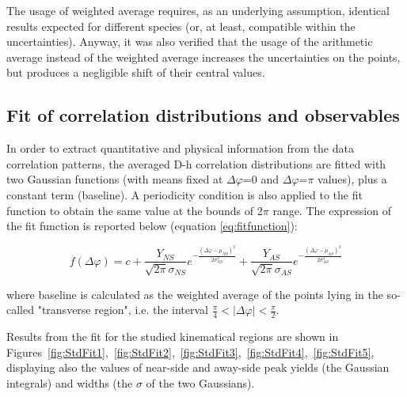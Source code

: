 The usage of weighted average requires, as an underlying assumption, identical results expected for different species (or, at least, compatible within the uncertainties). Anyway, it was also verified that the usage of the arithmetic average instead of the weighted average increases the uncertainties on the points, but produces a negligible shift of their central values.

\clearpage

\subsection{Fit of correlation distributions and observables}
In order to extract quantitative and physical information from the data correlation patterns, the averaged D-h correlation distributions are fitted with two Gaussian functions (with means fixed at $\Delta\varphi$=0 and $\Delta\varphi$=$\pi$ values), plus a constant term (baseline). A periodicity condition is also applied to the fit function to obtain the same value at the bounds of 2$\pi$ range. The expression of the fit function is reported below (equation \ref{eq:fitfunction}):

\begin{equation}
f\left(\Delta\varphi\right) = c + \frac{Y_{NS}}{\sqrt{2\pi}\sigma_{NS}}e^{-\frac{\left(\Delta\varphi-\mu_{NS}\right)^{2}}{2\sigma_{NS}^{2}}} + \frac{Y_{AS}}{\sqrt{2\pi}\sigma_{AS}}e^{-\frac{\left(\Delta\varphi-\mu_{AS}\right)^{2}}{2\sigma_{AS}^{2}}}
\label{eq:fitfunction}
\end{equation}

where baseline is calculated as the weighted average of the points lying in the so-called "transverse region", i.e. the interval $\frac{\pi}{4}<|\Delta\varphi|<\frac{\pi}{2}$.

Results from the fit for the studied kinematical regions are shown in Figures~\ref{fig:StdFit1},~\ref{fig:StdFit2},~\ref{fig:StdFit3},~\ref{fig:StdFit4},~\ref{fig:StdFit5}, displaying also the values of near-side and away-side peak yields (the Gaussian integrals) and widths (the $\sigma$ of the two Gaussians).

